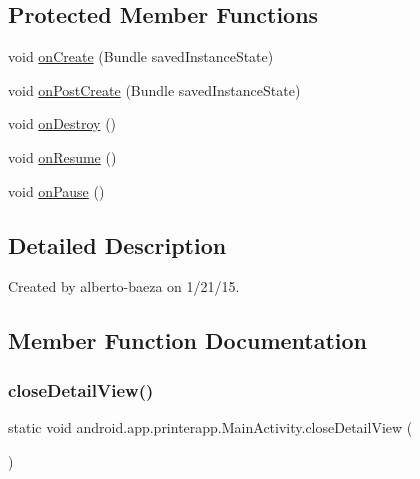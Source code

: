 \subsection*{Protected Member Functions}
\begin{DoxyCompactItemize}
\item 
void \hyperlink{classandroid_1_1app_1_1printerapp_1_1_main_activity_af28c0e33bdc7cfdbff7efb36d46acef1}{on\+Create} (Bundle saved\+Instance\+State)
\item 
void \hyperlink{classandroid_1_1app_1_1printerapp_1_1_main_activity_adc8260ba78533ab4f42af84648015831}{on\+Post\+Create} (Bundle saved\+Instance\+State)
\item 
void \hyperlink{classandroid_1_1app_1_1printerapp_1_1_main_activity_abc3768ab9fee986fd7e9df3d4699abd4}{on\+Destroy} ()
\item 
void \hyperlink{classandroid_1_1app_1_1printerapp_1_1_main_activity_a9959fbfebfc0bc6ba12d5a1259a0bdb3}{on\+Resume} ()
\item 
void \hyperlink{classandroid_1_1app_1_1printerapp_1_1_main_activity_a565253607fb37d2f4ec03049e4c8e14a}{on\+Pause} ()
\end{DoxyCompactItemize}


\subsection{Detailed Description}
Created by alberto-\/baeza on 1/21/15. 

\subsection{Member Function Documentation}
\mbox{\label{classandroid_1_1app_1_1printerapp_1_1_main_activity_ae2c29149af94926f0331e11d3f774b7a}} 
\subsubsection{\texorpdfstring{close\+Detail\+View()}{closeDetailView()}}
{\footnotesize\ttfamily static void android.\+app.\+printerapp.\+Main\+Activity.\+close\+Detail\+View (\begin{DoxyParamCaption}{ }\end{DoxyParamCaption})\hspace{0.3cm}{\ttfamily [static]}}

